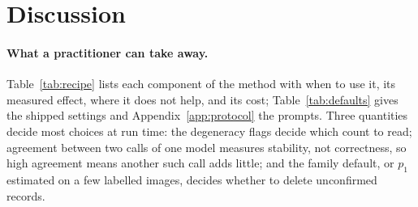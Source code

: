 \section{Discussion}\label{sec:discussion}

\paragraph{What a practitioner can take away.} Table~\ref{tab:recipe} lists each component of the method with when to use it, its measured effect, where it does not help, and its cost; Table~\ref{tab:defaults} gives the shipped settings and Appendix~\ref{app:protocol} the prompts. Three quantities decide most choices at run time: the degeneracy flags decide which count to read; agreement between two calls of one model measures stability, not correctness, so high agreement means another such call adds little; and the family default, or $p_1$ estimated on a few labelled images, decides whether to delete unconfirmed records.

